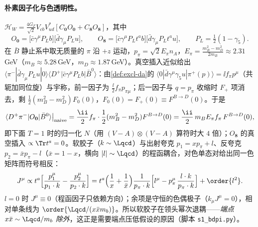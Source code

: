 \paragraph{朴素因子化与色透明性。}
$\mathcal H_W=\frac{4G_F}{\sqrt2}V_{cb}V_{ud}^*[C_{\mathbf 0}O_{\mathbf 0}+C_{\mathbf 8}O_{\mathbf 8}]$，其中\cite[式~(2)]{BauerPirjolStewart2001}
\begin{equation}\label{eq:heavy-O08}
O_{\mathbf 0}=\big[\bar c\gamma^\mu P_Lb\big]\big[\bar d\gamma_\mu P_Lu\big],\qquad
O_{\mathbf 8}=\big[\bar c\gamma^\mu P_Lt^ab\big]\big[\bar d\gamma_\mu P_Lt^au\big],\qquad P_L=\tfrac12(1-\gamma_5).
\end{equation}
在 $\bar B$ 静止系中取无质量的 $\pi$ 沿 $+z$ 运动，$p_\pi=\sqrt2E_\pi n_A$，$E_\pi=\frac{m_B^2-m_D^2}{2m_B}\approx2.31$\,GeV（$m_B\approx5.28$\,GeV，$m_D\approx1.87$\,GeV\cite{ParticleDataGroup:2024cfk}）。真空插入近似给出 $\langle\pi^-|\bar d\gamma_\mu P_Lu|0\rangle\langle D^+|\bar c\gamma^\mu P_Lb|\bar B^0\rangle$：由\cref{def:excl-da}的 $\langle0|\bar d\gamma^\mu\gamma_5u|\pi^+(p)\rangle=\ii f_\pi p^\mu$（共轭加同位旋）与宇称，前一因子为 $\frac{\ii}{2}f_\pi p_{\pi\mu}$；后一因子与 $q=p_\pi$ 收缩时 $F_+$ 项消去，剩 $\frac12(m_B^2-m_D^2)F_0(0)$，$F_0(0)=F_+(0)\equiv F^{B\to D}(0)$。于是
\begin{equation}\label{eq:heavy-naive}
\langle D^+\pi^-|O_{\mathbf 0}|\bar B^0\rangle\big|_{\rm naive}=\frac{\ii}{2}f_\pi\cdot\frac12(m_B^2-m_D^2)F^{B\to D}(0)=\frac{\ii}{2}\,m_BE_\pi f_\pi\,F^{B\to D}(0),
\end{equation}
即下面 $T=1$ 时的归一化 $N$（用 $(V-A)\otimes(V-A)$ 算符时大 $4$ 倍）；$O_{\mathbf 8}$ 的真空插入 $\propto\Tr t^a=0$。软胶子（$k\sim\Lqcd$）与出射夸克 $p_1=xp_\pi+l$、反夸克 $p_2=\bar xp_\pi-l$（$\bar x=1-x$，横向 $|l|\sim\Lqcd$）的程函耦合，对色单态对给出同一色矩阵而符号相反：
\begin{equation}\label{eq:heavy-dipole}
J^\mu\propto t^a\Big[\frac{p_1^\mu}{p_1\cdot k}-\frac{p_2^\mu}{p_2\cdot k}\Big]
=t^a\Big(\frac1x+\frac1{\bar x}\Big)\frac{1}{p_\pi\cdot k}\Big[l^\mu-p_\pi^\mu\,\frac{l\cdot k}{p_\pi\cdot k}\Big]+\order{l^2}.
\end{equation}
$l=0$ 时 $J^\mu\equiv0$（程函因子只依赖方向）；余项是守恒的色偶极子（$k_\mu J^\mu=0$），相对单条线为 $\order{\Lqcd/(x\bar xm_b)}$。所以软胶子在领头幂次退耦——\emph{端点 $x\bar x\sim\Lqcd/m_b$ 除外}，这正是需要端点压低假设的原因（脚本 \texttt{s1\_\allowbreak bdpi.py}）。

